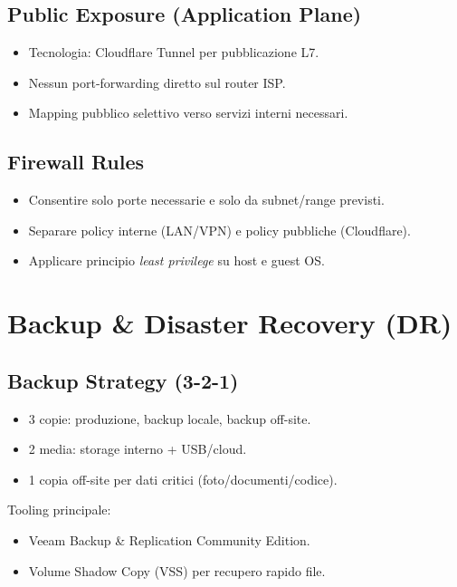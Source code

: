 \documentclass[11pt,a4paper]{article}
\begin{document}
\subsection{Public Exposure (Application Plane)}
\begin{itemize}
  \item Tecnologia: Cloudflare Tunnel per pubblicazione L7.
  \item Nessun port-forwarding diretto sul router ISP.
  \item Mapping pubblico selettivo verso servizi interni necessari.
\end{itemize}

\subsection{Firewall Rules}
\begin{itemize}
  \item Consentire solo porte necessarie e solo da subnet/range previsti.
  \item Separare policy interne (LAN/VPN) e policy pubbliche (Cloudflare).
  \item Applicare principio \textit{least privilege} su host e guest OS.
\end{itemize}

\section{Backup \& Disaster Recovery (DR)}

\subsection{Backup Strategy (3-2-1)}
\begin{itemize}
  \item 3 copie: produzione, backup locale, backup off-site.
  \item 2 media: storage interno + USB/cloud.
  \item 1 copia off-site per dati critici (foto/documenti/codice).
\end{itemize}

Tooling principale:
\begin{itemize}
  \item Veeam Backup \& Replication Community Edition.
  \item Volume Shadow Copy (VSS) per recupero rapido file.
\end{itemize}
\end{document}
